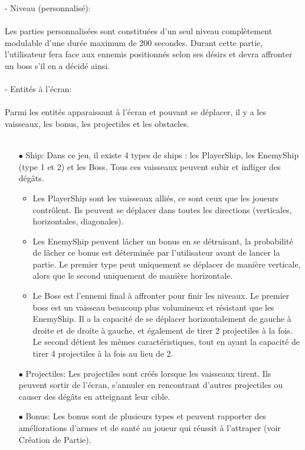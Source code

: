 \documentclass[a4paper,12pt]{article}
\begin{document}
- Niveau (personnalisé):\\ \\
Les parties personnalisées sont constituées d'un seul niveau complètement modulable d'une durée maximum de 200 secondes. Durant cette partie, l'utilisateur fera face aux ennemis positionnés selon ses désirs et devra affronter un boss s'il en a décidé ainsi.\\ \\

- Entités à l’écran:\\ \\
Parmi les entités apparaissant à l’écran et pouvant se déplacer, il y a les vaisseaux, les bonus, 
les projectiles et les obstacles.\\ \\
\begin{itemize}
    \item[$\bullet$ Ship:]Dans ce jeu, il existe 4 types de ships : les PlayerShip, les EnemyShip (type 1 et 2) et les Boss. Tous ces vaisseaux peuvent subir et infliger des dégâts. 
    \begin{itemize}
        \item Les PlayerShip sont les vaisseaux alliés, ce sont ceux que les joueurs contrôlent. Ils peuvent se déplacer dans toutes les directions (verticales, horizontales, diagonales).
        \item Les EnemyShip peuvent lâcher un bonus en se détruisant, la probabilité de lâcher ce bonus est déterminée par l’utilisateur avant de lancer la partie. Le premier type peut uniquement se déplacer de manière verticale, alors que le second uniquement de manière horizontale.
        \item Le Boss est l’ennemi final à affronter pour finir les niveaux. Le premier boss est un vaisseau beaucoup plus volumineux et résistant que les EnemyShip. Il a la capacité de se déplacer horizontalement de gauche à droite et de droite à gauche, et également de tirer 2 projectiles à la fois. Le second détient les mêmes caractéristiques, tout en ayant la capacité de tirer 4 projectiles à la fois au lieu de 2.\\
    \end{itemize}

    \item[$\bullet$ Projectiles:]Les projectiles sont créés lorsque les vaisseaux tirent. Ils peuvent sortir de l’écran, s’annuler en rencontrant d’autres projectiles ou causer des dégâts en atteignant leur cible.\\

    \item[$\bullet$ Bonus:]Les bonus sont de plusieurs types et peuvent rapporter des améliorations d’armes et de santé au joueur qui réussit à l'attraper (voir Création de Partie).
\end{itemize}
\end{document}
